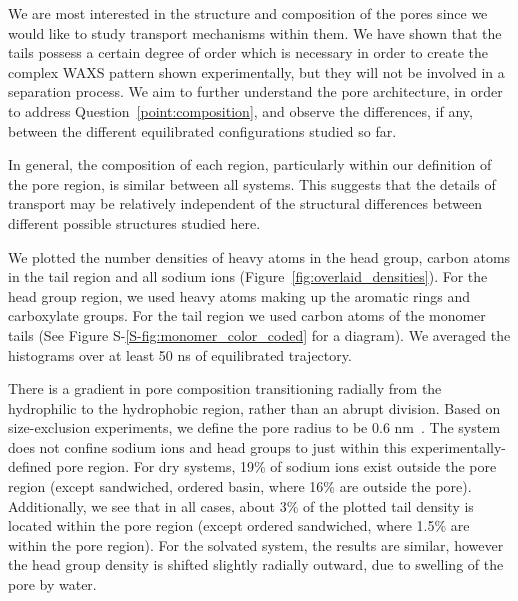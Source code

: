 \documentclass[journal=jpcbfk,manuscript=article]{achemso}
\begin{document}
  We are most interested in the structure and composition of the pores since we
  would like to study transport mechanisms within them. We have shown that the
  tails possess a certain degree of order which is necessary in order to create
  the complex WAXS pattern shown experimentally, but they will not be involved in
  a separation process. We aim to further understand the pore architecture, in
  order to address Question~\ref{point:composition}, and observe the differences,
  if any, between the different equilibrated configurations studied so far.

  In general, the composition of each region, particularly within our
  definition of the pore region, is similar between all systems.  This suggests
  that the details of transport may be relatively independent of the structural
  differences between different possible structures studied here.
  
  We plotted the number densities of heavy atoms in the head group, carbon atoms in the tail
  region and all sodium ions (Figure~\ref{fig:overlaid_densities}). For the head group
  region, we used heavy atoms making up the aromatic rings and carboxylate groups. For the tail
  region we used carbon atoms of the monomer tails (See Figure S-\ref{S-fig:monomer_color_coded}
  for a diagram). We averaged the histograms over at least 50 ns of equilibrated trajectory.

  There is a gradient in pore composition transitioning radially from the hydrophilic 
  to the hydrophobic region, rather than an abrupt division. Based on size-exclusion 
  experiments, we define the pore radius to be 0.6 nm~\cite{zhou_supported_2005}. 
  The system does not confine
  sodium ions and head groups to just within this experimentally-defined pore region. For dry systems,
  19\% of sodium ions exist outside the pore region (except sandwiched, ordered basin,
  where 16\% are outside the pore). Additionally, we see that in all cases, about 
  3\% of the plotted tail density is located within the pore region (except ordered sandwiched,
  where 1.5\% are within the pore region). For the solvated system, the results are similar,
  however the head group density is shifted slightly radially outward, due to
  swelling of the pore by water. 
  
\end{document}
